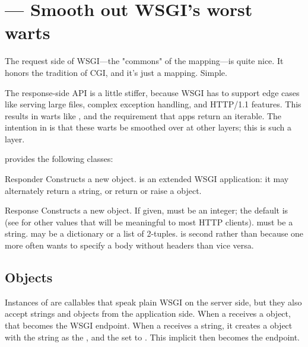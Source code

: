 \section{ ---
         Smooth out WSGI's worst warts}



The request side of WSGI---the "commons" of the  mapping---is quite
nice. It honors the tradition of CGI, and it's just a mapping. Simple.

The response-side API is a little stiffer, because WSGI has to support edge
cases like serving large files, complex exception handling, and HTTP/1.1
features. This results in warts like , and the requirement
that apps return an iterable. The intention in  is that these warts be smoothed
over at other layers; this is such a layer.

 provides the following classes:

\begin{classdesc}{Responder}{}
Constructs a new  object.  is an extended WSGI
application: it may alternately return a string, or return or raise a
 object.
\end{classdesc}

\begin{classdesc}{Response}{  }
Constructs a new  object. If given,  must be an
integer; the default is
(see  for other values
that will be meaningful to most HTTP clients).  must be a string.
 may be a dictionary or a list of 2-tuples.  is second
rather than  because one more often wants to specify a body without
headers than vice versa.
\end{classdesc}


\subsection{ Objects}

Instances of  are callables that speak plain WSGI on the
server side, but they also accept strings and  objects from the
application side. When a  receives a  object,
that becomes the WSGI endpoint. When a  receives a string, it
creates a  object with the string as the , and the
 set to . This implicit
 then becomes the endpoint.



